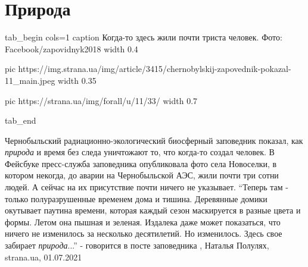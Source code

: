  
 
 
 
 
\chapter{Природа}
\label{sec:slova.priroda}


\ifcmt
  tab_begin cols=1
     caption Когда-то здесь жили почти триста человек. Фото: Facebook/zapovidnyk2018
     width 0.4

     pic https://img.strana.ua/img/article/3415/chernobylskij-zapovednik-pokazal-11_main.jpeg
     width 0.35

     pic https://strana.ua/img/forall/u/11/33/%
     width 0.7

  tab_end
\fi

Чернобыльский радиационно-экологический биосферный заповедник показал,
как \emph{природа} и время без следа уничтожают то, что когда-то создал человек.  В
Фейсбуке пресс-служба заповедника опубликовала фото села Новоселки, в котором
некогда, до аварии на Чернобыльской АЭС, жили почти три сотни людей. А сейчас
на их присутствие почти ничего не указывает. \enquote{Теперь там - только
полуразрушенные временем дома и тишина. Деревянные домики окутывает паутина
времени, которая каждый сезон маскируется в разные цвета и формы. Летом она
пышная и зеленая. Издалека даже может показаться, что ничего не изменилось за
несколько десятилетий. Но изменилось. Здесь свое забирает \emph{природа}...} -
говорится в посте заповедника
, 
Наталья Полулях, strana.ua, 01.07.2021
